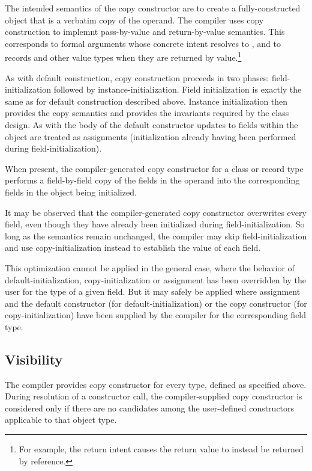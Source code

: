 The intended semantics of the copy constructor are to create a fully-constructed
object that is a verbatim copy of the operand.  The compiler uses copy
construction to implemnt pass-by-value and return-by-value semantics.  This
corresponds to formal arguments whose concrete intent resolves to , and
to records and other value types when they are returned by value.\footnote{For
  example, the return intent  causes the return value to instead be
  returned by reference.}

As with default construction, copy construction proceeds in two phases:
field-initialization followed by instance-initialization.  Field initialization
is exactly the same as for default construction described above.  Instance
initialization then provides the copy semantics and provides the invariants
required by the class design.  As with the body of the default constructor
updates to fields within the object are treated as assignments (initialization
already having been performed during field-initialization).

When present, the compiler-generated copy constructor for a class or record type
performs a field-by-field copy of the fields in the operand into the
corresponding fields in the object being initialized.  

\begin{note}
It may be observed that the compiler-generated copy constructor overwrites every
field, even though they have already been initialized during
field-initialization.  So long as the semantics remain unchanged, the compiler
may skip field-initialization and use copy-initialization instead to establish
the value of each field.

This optimization cannot be applied in the general case, where the behavior of
default-initialization, copy-initialization or assignment has been overridden by
the user for the type of a given field.  But it may safely be applied where
assignment and the default constructor (for default-initialization) or the copy
constructor (for copy-initialization) have been supplied by the compiler for the
corresponding field type.
\end{note}

\subsection{Visibility}

The compiler provides copy constructor for every type, defined as specified
above.  During resolution of a constructor call, the compiler-supplied copy
constructor is considered only if there are no candidates among the user-defined
constructors applicable to that object type.


